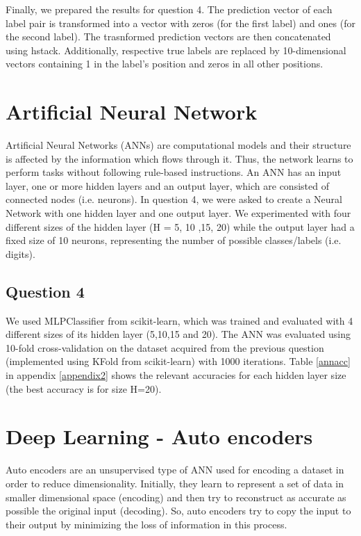 \documentclass[12pt]{article}
\begin{document}
	Finally, we prepared the results for question 4. The prediction vector of each label pair  is transformed into a vector with zeros (for the first label) and ones (for the second label). The trasnformed prediction vectors are then concatenated using hstack. Additionally, respective true labels are replaced by 10-dimensional vectors containing 1 in the label's position and zeros in all other positions.
	
	\section{Artificial Neural Network}
	
	Artificial Neural Networks (ANNs) are computational models and their structure is affected by the information which flows through it. Thus, the network learns to perform tasks without following rule-based instructions. An ANN has an input layer, one or more hidden layers and an output layer, which are consisted of connected nodes (i.e. neurons). In question 4, we were asked to create a Neural Network with one hidden layer and one output layer. We experimented with four different sizes of the hidden layer (H = {5, 10 ,15, 20}) while the output layer had a fixed size of 10 neurons, representing the number of possible classes/labels (i.e. digits).
	
	\subsection{Question 4}
	
	We used MLPClassifier from scikit-learn, which was trained and evaluated with 4 different sizes of its hidden layer (5,10,15 and 20). The ANN was evaluated using 10-fold cross-validation on the dataset acquired from the previous question (implemented using KFold from scikit-learn) with 1000 iterations. Table \ref{annacc} in appendix \ref{appendix2} shows the relevant accuracies for each hidden layer size (the best accuracy is for size H=20).
	
	\section{Deep Learning - Auto encoders}
	
	Auto encoders are an unsupervised type of ANN used for encoding a dataset in order to reduce dimensionality. Initially, they learn to represent a set of data in smaller dimensional space (encoding) and then try to reconstruct as accurate as possible the original input (decoding). So, auto encoders try to copy the input to their output by minimizing the loss of information in this process.
	
\end{document}
